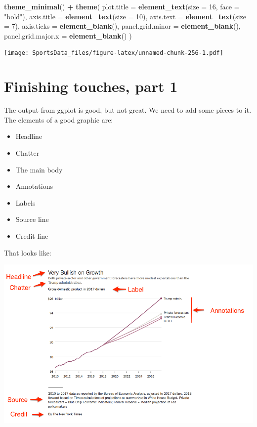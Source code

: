 \documentclass[]{book}
\newenvironment{Shaded}{\begin{snugshade}}{\end{snugshade}}
\newcommand{\DataTypeTok}[1]{\textcolor[rgb]{0.13,0.29,0.53}{#1}}
\newcommand{\DecValTok}[1]{\textcolor[rgb]{0.00,0.00,0.81}{#1}}
\newcommand{\KeywordTok}[1]{\textcolor[rgb]{0.13,0.29,0.53}{\textbf{#1}}}
\newcommand{\NormalTok}[1]{#1}
\newcommand{\OperatorTok}[1]{\textcolor[rgb]{0.81,0.36,0.00}{\textbf{#1}}}
\newcommand{\StringTok}[1]{\textcolor[rgb]{0.31,0.60,0.02}{#1}}
\providecommand{\tightlist}{%
  \setlength{\itemsep}{0pt}\setlength{\parskip}{0pt}}
\begin{document}
\begin{Shaded}
\begin{Highlighting}[]
\StringTok{  }\KeywordTok{theme_minimal}\NormalTok{() }\OperatorTok{+}\StringTok{ }
\StringTok{  }\KeywordTok{theme}\NormalTok{(}
    \DataTypeTok{plot.title =} \KeywordTok{element_text}\NormalTok{(}\DataTypeTok{size =} \DecValTok{16}\NormalTok{, }\DataTypeTok{face =} \StringTok{"bold"}\NormalTok{),}
    \DataTypeTok{axis.title =} \KeywordTok{element_text}\NormalTok{(}\DataTypeTok{size =} \DecValTok{10}\NormalTok{),}
    \DataTypeTok{axis.text =} \KeywordTok{element_text}\NormalTok{(}\DataTypeTok{size =} \DecValTok{7}\NormalTok{),}
    \DataTypeTok{axis.ticks =} \KeywordTok{element_blank}\NormalTok{(),}
    \DataTypeTok{panel.grid.minor =} \KeywordTok{element_blank}\NormalTok{(),}
    \DataTypeTok{panel.grid.major.x =} \KeywordTok{element_blank}\NormalTok{()}
\NormalTok{  )}
\end{Highlighting}
\end{Shaded}

\texttt{[image: SportsData\_files/figure-latex/unnamed-chunk-256-1.pdf]}

\hypertarget{finishing-touches-part-1}{%
\chapter{Finishing touches, part 1}\label{finishing-touches-part-1}}

The output from ggplot is good, but not great. We need to add some pieces to it. The elements of a good graphic are:

\begin{itemize}
\tightlist
\item
  Headline
\item
  Chatter
\item
  The main body
\item
  Annotations
\item
  Labels
\item
  Source line
\item
  Credit line
\end{itemize}

That looks like:

\includegraphics[width=12.97in]{images/chartannotated}
\end{document}
